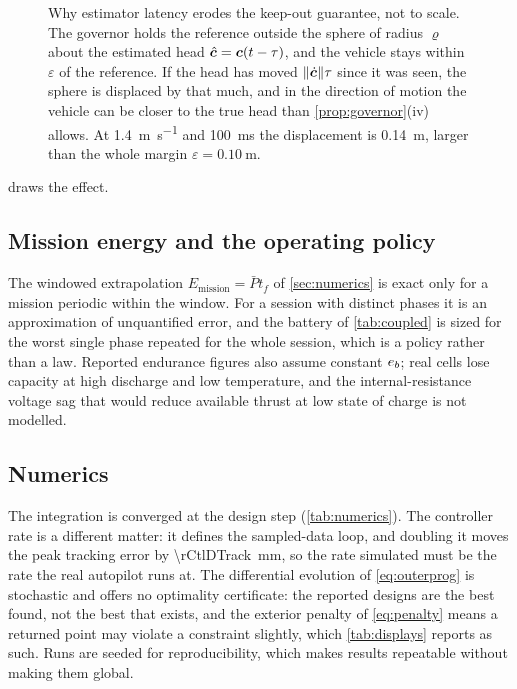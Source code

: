 \begin{figure}[tbp]
\centering

\caption{Why estimator latency erodes the keep-out guarantee, not to scale.
The governor holds the reference outside the sphere of radius $\varrho$ about
the estimated head $\hat{\bm{c}}=\bm{c}(t-\tau)$, and the vehicle stays
within $\varepsilon$ of the reference. If the head has moved
$\|\dot{\bm{c}}\|\tau$ since it was seen, the sphere is displaced by that much,
and in the direction of motion the vehicle can be closer to the true head
than \cref{prop:governor}(iv) allows. At \SI{1.4}{\metre\per\second} and
\SI{100}{\milli\second} the displacement is \SI{0.14}{\metre}, larger than the
whole margin $\varepsilon=\SI{0.10}{\metre}$.}
\label{fig:latency}
\end{figure}

 draws the effect.

\subsection{Mission energy and the operating policy}

The windowed extrapolation $E_{\mathrm{mission}}=\bar P t_f$ of
\cref{sec:numerics} is exact only for a mission periodic within the window. For
a session with distinct phases it is an approximation of unquantified error,
and the battery of \cref{tab:coupled} is sized for the worst single phase
repeated for the whole session, which is a policy rather than a law. Reported
endurance figures also assume constant $e_b$; real cells lose capacity at high
discharge and low temperature, and the internal-resistance voltage sag that
would reduce available thrust at low state of charge is not modelled.

\subsection{Numerics}

The integration is converged at the design step (\cref{tab:numerics}). The
controller rate is a different matter: it defines the sampled-data loop, and
doubling it moves the peak tracking error by \SI{\rCtlDTrack}{\milli\metre}, so
the rate simulated must be the rate the real autopilot runs at. The
differential evolution of \cref{eq:outerprog} is
stochastic and offers no optimality certificate: the reported designs are the
best found, not the best that exists, and the exterior penalty of
\cref{eq:penalty} means a returned point may violate a constraint slightly,
which \cref{tab:displays} reports as such. Runs are seeded for
reproducibility, which makes results repeatable without making them global.


